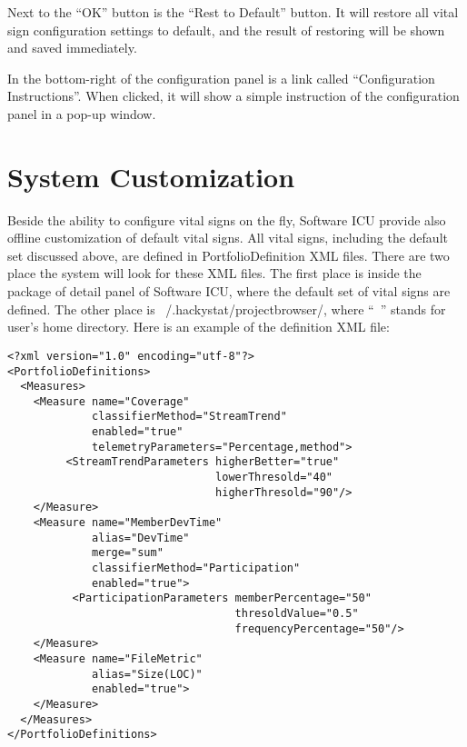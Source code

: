 Next to the ``OK'' button is the ``Rest to Default'' button. It will restore all vital sign configuration settings to default, and the result of restoring will be shown and saved immediately. 

In the bottom-right of the configuration panel is a link called ``Configuration Instructions''. When clicked, it will show a simple instruction of the configuration panel in a pop-up window.


\section{System Customization}
\label{SystemCustomization}

Beside the ability to configure vital signs on the fly, Software ICU provide also offline customization of default vital signs. All vital signs, including the default set discussed above, are defined in PortfolioDefinition XML files. There are two place the system will look for these XML files. The first place is inside the package of detail panel of Software ICU, where the default set of vital signs are defined. The other place is ~/.hackystat/projectbrowser/, where ``~'' stands for user's home directory. Here is an example of the definition XML file:

\begin{verbatim}
<?xml version="1.0" encoding="utf-8"?>
<PortfolioDefinitions>
  <Measures>
    <Measure name="Coverage" 
             classifierMethod="StreamTrend" 
             enabled="true"
             telemetryParameters="Percentage,method">
         <StreamTrendParameters higherBetter="true" 
                                lowerThresold="40" 
                                higherThresold="90"/>
    </Measure>
    <Measure name="MemberDevTime" 
             alias="DevTime" 
             merge="sum" 
             classifierMethod="Participation" 
             enabled="true">
          <ParticipationParameters memberPercentage="50" 
                                   thresoldValue="0.5" 
                                   frequencyPercentage="50"/>
    </Measure>
    <Measure name="FileMetric" 
             alias="Size(LOC)" 
             enabled="true">
    </Measure>
  </Measures>
</PortfolioDefinitions>
\end{verbatim}


